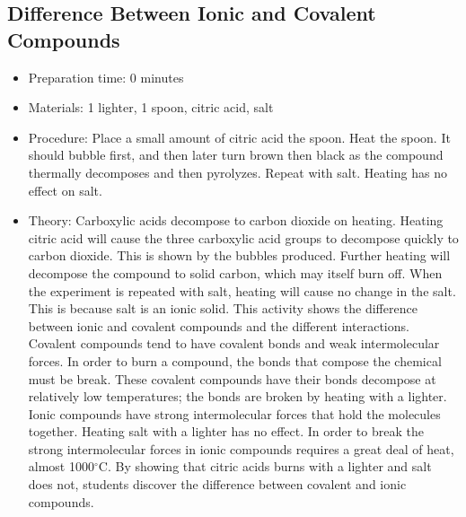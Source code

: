 \subsection{Difference Between Ionic and Covalent Compounds}
\begin{itemize}
\item{Preparation time: 0 minutes}
\item{Materials: 1 lighter, 1 spoon, citric acid, salt}
\item{Procedure: Place a small amount of citric acid the spoon. Heat the spoon. It should bubble first, and then later turn brown then black as the compound thermally decomposes and then pyrolyzes. Repeat with salt. Heating has no effect on salt.}
\item{Theory: Carboxylic acids decompose to carbon dioxide on heating. Heating citric acid will cause the three carboxylic acid groups to decompose quickly to carbon dioxide. This is shown by the bubbles produced. Further heating will decompose the compound to solid carbon, which may itself burn off. When the experiment is repeated with salt, heating will cause no change in the salt. This is because salt is an ionic solid. This activity shows the difference between ionic and covalent compounds and the different interactions. Covalent compounds tend to have covalent bonds and weak intermolecular forces. In order to burn a compound, the bonds that compose the chemical must be break. These covalent compounds have their bonds decompose at relatively low temperatures; the bonds are broken by heating with a lighter. Ionic compounds have strong intermolecular forces that hold the molecules together. Heating salt with a lighter has no effect. In order to break the strong intermolecular forces in ionic compounds requires a great deal of heat, almost 1000$^\circ$C. By showing that citric acids burns with a lighter and salt does not, students discover the difference between covalent and ionic compounds.}
\end{itemize}

